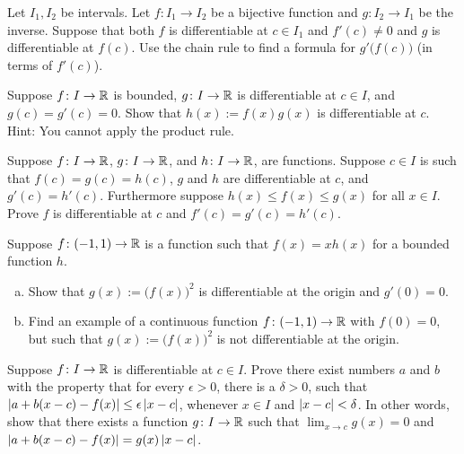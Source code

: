 \begin{exercise}
Let $I_1, I_2$ be intervals.
Let $f \colon I_1 \to I_2$ be a bijective function and $g \colon I_2 \to I_1$
be the inverse.  Suppose that both $f$ is differentiable at $c \in I_1$ and
$f'(c) \not=0$ and $g$ is differentiable at $f(c)$.  Use the chain rule
to find a formula for $g'\bigl(f(c)\bigr)$ (in terms of $f'(c)$).
\end{exercise}

\begin{exercise} \label{exercise:bndmuldiff}
Suppose $f \colon I \to {\mathbb{R}}$ is bounded, $g \colon I \to
{\mathbb{R}}$ is differentiable at $c \in I$, and $g(c) = g'(c) = 0$.  Show
that $h(x) := f(x) g(x)$ is differentiable at $c$.  Hint: You
cannot apply the product rule.
\end{exercise}

\begin{exercise} \label{exercise:diffsqueeze}
Suppose $f \colon I \to {\mathbb{R}}$, 
$g \colon I \to {\mathbb{R}}$, and
$h \colon I \to {\mathbb{R}}$, are functions.  Suppose $c \in I$ is such that
$f(c) = g(c) = h(c)$, $g$ and $h$ are differentiable at $c$,
and $g'(c) = h'(c)$.  Furthermore suppose $h(x) \leq f(x) \leq g(x)$ for
all $x \in I$.  Prove $f$ is differentiable at $c$ and $f'(c) = g'(c) =
h'(c)$.
\end{exercise}

\begin{exercise}
Suppose $f \colon (-1,1) \to {\mathbb{R}}$ is a function such that $f(x) = x h(x)$ for a bounded
function $h$.
\begin{enumerate}[a)]
\item
Show that $g(x) := {\bigl( f(x) \bigr)}^2$ is
differentiable at the origin and $g'(0) = 0$.
\item
Find an example of a
continuous function $f \colon (-1,1) \to {\mathbb{R}}$ with $f(0) = 0$, but such
that $g(x) := {\bigl( f(x) \bigr)}^2$ is not differentiable at the origin.
\end{enumerate}
\end{exercise}

\begin{exercise}
Suppose $f \colon I \to {\mathbb{R}}$ is differentiable at $c \in I$.
Prove there exist numbers $a$ and $b$ with the property that
for every $\epsilon > 0$, there is a $\delta > 0$, such that
$\left\lvert {a+b(x-c) - f(x)} \right\rvert \leq \epsilon \left\lvert {x-c} \right\rvert$, whenever $x \in I$ and
$\left\lvert {x-c} \right\rvert < \delta$.
In other words, show that
there exists a function $g \colon I \to {\mathbb{R}}$
such that $\lim_{x\to c} g(x) = 0$ and
$\left\lvert {a+b(x-c) - f(x)} \right\rvert = g(x) \left\lvert {x-c} \right\rvert$.
\end{exercise}

